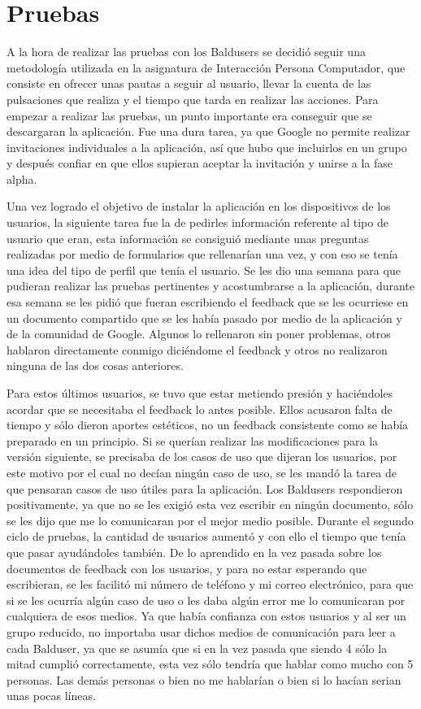 \section{Pruebas}
\label{secc:pruebas}

A la hora de realizar las pruebas con los Baldusers se decidió seguir una metodología utilizada en la asignatura de Interacción Persona Computador, que consiste en ofrecer unas pautas a seguir al usuario, llevar la cuenta de las pulsaciones que realiza y el tiempo que tarda en realizar las acciones.
Para empezar a realizar las pruebas, un punto importante era conseguir que se descargaran la aplicación.
Fue una dura tarea, ya que Google no permite realizar invitaciones individuales a la aplicación, así que hubo que incluirlos en un grupo y después confiar en que ellos supieran aceptar la invitación y unirse a la fase alpha.

Una vez logrado el objetivo de instalar la aplicación en los dispositivos de los usuarios, la siguiente tarea fue la de pedirles información referente al tipo de usuario que eran, esta información se consiguió mediante unas preguntas realizadas por medio de formularios que rellenarían una vez, y con eso se tenía una idea del tipo de perfil que tenía el usuario.
Se les dio una semana para que pudieran realizar las pruebas pertinentes y acostumbrarse a la aplicación, durante esa semana se les pidió que fueran escribiendo el feedback que se les ocurriese en un documento compartido que se les había pasado por medio de la aplicación y de la comunidad de Google.
Algunos lo rellenaron sin poner problemas, otros hablaron directamente conmigo diciéndome el feedback y otros no realizaron ninguna de las dos cosas anteriores.

Para estos últimos usuarios, se tuvo que estar metiendo presión y haciéndoles acordar que se necesitaba el feedback lo antes posible. Ellos acusaron falta de tiempo y sólo dieron aportes estéticos, no un feedback consistente como se había preparado en un principio.
Si se querían realizar las modificaciones para la versión siguiente, se precisaba de los casos de uso que dijeran los usuarios, por este motivo por el cual no decían ningún caso de uso, se les mandó la tarea de que pensaran casos de uso útiles para la aplicación.
Los Baldusers respondieron positivamente, ya que no se les exigió esta vez escribir en ningún documento, sólo se les dijo que me lo comunicaran por el mejor medio posible.
Durante el segundo ciclo de pruebas, la cantidad de usuarios aumentó y con ello el tiempo que tenía que pasar ayudándoles también.
De lo aprendido en la vez pasada sobre los documentos de feedback con los usuarios, y para no estar esperando que escribieran, se les facilitó mi número de teléfono y mi correo electrónico, para que si se les ocurría algún caso de uso o les daba algún error me lo comunicaran por cualquiera de esos medios. Ya que había confianza con estos usuarios y al ser un grupo reducido, no importaba usar dichos medios de comunicación para leer a cada Balduser, ya que se asumía que si en la vez pasada que siendo 4 sólo la mitad cumplió correctamente, esta vez sólo tendría que hablar como mucho con 5 personas. Las demás personas o bien no me hablarían o bien si lo hacían serian unas pocas líneas.

